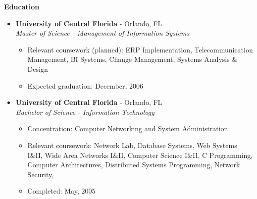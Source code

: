 \documentclass[10pt,oneside]{article}
\newenvironment{ressection}[1]{
	\vspace{4pt}
	\textbf{\selectfont\normalsize#1}
	\begin{itemize}
	\vspace{3pt}
}{
	\end{itemize}
}
\newcommand{\ressubitem}[1]{
	\vspace{-1pt}
	\item \begin{flushleft} #1 \end{flushleft}
}
\newcommand{\resbigitem}[3]{
	\vspace{-5pt}
	\item
	\textbf{#1} - #2 \\
	\textit{#3}
}
\newenvironment{ressubsec}[3]{
	\resbigitem{#1}{#2}{#3}
	\vspace{-2pt}
	\begin{itemize}
}{
	\end{itemize}
}
\begin{document}

\begin{ressection}{Education}

	\begin{ressubsec}{University of Central Florida}{Orlando, FL}{Master of Science - Management of Information Systems}
		\ressubitem{Relevant coursework (planned): ERP Implementation, Telecommunication Management, BI Systems, Change Management, Systems Analysis \& Design}
		\ressubitem{Expected graduation: December, 2006}
	\end{ressubsec}

	\begin{ressubsec}{University of Central Florida}{Orlando, FL}{Bachelor of Science - Information Technology}
		\ressubitem{Concentration: Computer Networking and System Administration}
		\ressubitem{Relevant coursework: Network Lab, Database Systems, Web Systems I\&II, Wide Area Networks I\&II, Computer Science I\&II, C Programming, Computer Architectures, Distributed Systems Programming, Network Security, }
		\ressubitem{Completed: May, 2005}
	\end{ressubsec}

\end{ressection}

\end{document}
